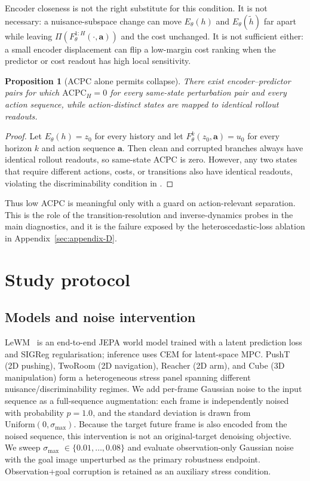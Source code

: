 \documentclass[10pt]{article}
\newtheorem{proposition}{Proposition}
\newcommand{\stdmax}{\ensuremath{\sigma_{\max}}}
\begin{document}
Encoder closeness is not the right substitute for this condition. It is not necessary: a nuisance-subspace change can move $E_\theta(h)$ and $E_\theta(\tilde h)$ far apart while leaving $\Pi(F_\theta^{1:H}(\cdot,\mathbf a))$ and the cost unchanged. It is not sufficient either: a small encoder displacement can flip a low-margin cost ranking when the predictor or cost readout has high local sensitivity.

\begin{proposition}[ACPC alone permits collapse]\label{prop:acpc-collapse}
There exist encoder--predictor pairs for which $\mathrm{ACPC}_H=0$ for every same-state perturbation pair and every action sequence, while action-distinct states are mapped to identical rollout readouts.
\end{proposition}

\begin{proof}
Let $E_\theta(h)=z_0$ for every history and let $F_\theta^k(z_0,\mathbf a)=u_0$ for every horizon $k$ and action sequence $\mathbf a$. Then clean and corrupted branches always have identical rollout readouts, so same-state ACPC is zero. However, any two states that require different actions, costs, or transitions also have identical readouts, violating the discriminability condition in .
\end{proof}

Thus low ACPC is meaningful only with a guard on action-relevant separation. This is the role of the transition-resolution and inverse-dynamics probes in the main diagnostics, and it is the failure exposed by the heteroscedastic-loss ablation in Appendix~\ref{sec:appendix-D}.

\section{Study protocol}\label{sec:bg}

\subsection{Models and noise intervention}\label{sec:bg-models}

LeWM~\cite{maes2026lewm} is an end-to-end JEPA world model trained with a latent prediction loss and SIGReg regularisation; inference uses CEM for latent-space MPC. PushT (2D pushing), TwoRoom (2D navigation), Reacher (2D arm), and Cube (3D manipulation) form a heterogeneous stress panel spanning different nuisance/discriminability regimes. We add per-frame Gaussian noise to the input sequence as a full-sequence augmentation: each frame is independently noised with probability $p=1.0$, and the standard deviation is drawn from $\mathrm{Uniform}(0,\stdmax{})$. Because the target future frame is also encoded from the noised sequence, this intervention is not an original-target denoising objective. We sweep \stdmax{} $\in \{0.01,\dots,0.08\}$ and evaluate observation-only Gaussian noise with the goal image unperturbed as the primary robustness endpoint. Observation+goal corruption is retained as an auxiliary stress condition.
\end{document}
